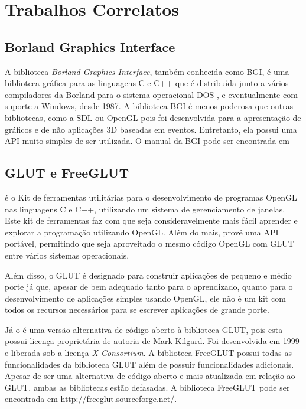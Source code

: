 \documentclass[12pt, %
openright,
oneside, %
a4paper,    %
brazil]{facom-ufu-abntex2}
\begin{document}
\chapter{Trabalhos Correlatos}

\section{Borland Graphics Interface}
A biblioteca \textit{Borland Graphics Interface}, também conhecida como BGI, é uma biblioteca gráfica para as linguagens C e C++ que é distribuída junto a vários compiladores da Borland para o sistema operacional DOS \cite{BGI:Drivers}, e eventualmente com suporte a Windows, desde 1987. A biblioteca BGI é menos poderosa que outras bibliotecas, como a SDL ou OpenGL pois foi desenvolvida para a apresentação de gráficos e de não aplicações 3D baseadas em eventos. Entretanto, ela possui uma API muito simples de ser utilizada. O manual da BGI pode ser encontrada em 

\section{GLUT e FreeGLUT}
 é o Kit de ferramentas utilitárias para o desenvolvimento de programas OpenGL nas linguagens C e C++, utilizando um sistema de gerenciamento de janelas. Este kit de ferramentas faz com que seja consideravelmente mais fácil aprender e explorar a programação utilizando OpenGL. Além do mais, provê uma API portável, permitindo que seja aproveitado o mesmo código OpenGL com GLUT entre vários sistemas operacionais.

Além disso, o GLUT é designado para construir aplicações de pequeno e médio porte já que, apesar de bem adequado tanto para o aprendizado, quanto para o desenvolvimento de aplicações simples usando OpenGL, ele não é um kit com todos os recursos necessários para se escrever aplicações de grande porte.

Já o  é uma versão alternativa de código-aberto à biblioteca GLUT, pois esta possui licença proprietária de autoria de Mark Kilgard. Foi desenvolvida em 1999 e liberada sob a licença \textit{X-Consortium}. A biblioteca FreeGLUT possui todas as funcionalidades da biblioteca GLUT além de possuir funcionalidades adicionais. Apesar de ser uma alternativa de código-aberto e mais atualizada em relação ao GLUT, ambas as bibliotecas estão defasadas. A biblioteca FreeGLUT pode ser encontrada em \url{http://freeglut.sourceforge.net/}.
\end{document}
